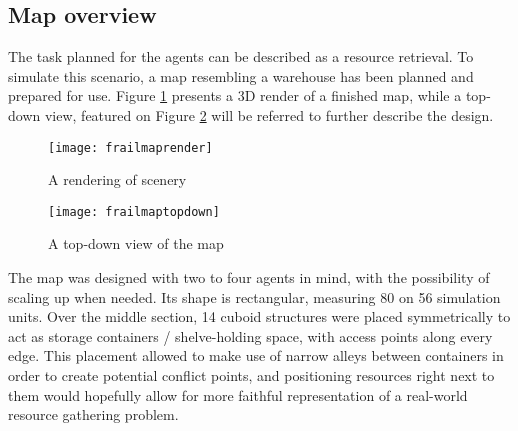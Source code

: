 \subsection{Map overview}
The task planned for the agents can be described as a resource retrieval. To simulate this scenario, a map resembling a warehouse has been planned and prepared for use. Figure \ref{fig:x simmaprender} presents a 3D render of a finished map, while a top-down view, featured on Figure \ref{fig:x simmaptopdown} will be referred to further describe the design.

\begin{figure}[h]
    \centering
    \texttt{[image: frailmaprender]}
    \caption{A rendering of scenery}
    \label{fig:x simmaprender}
\end{figure}

\begin{figure}[h]
    \centering
    \texttt{[image: frailmaptopdown]}
    \caption{A top-down view of the map}
    \label{fig:x simmaptopdown}
\end{figure}

The map was designed with two to four agents in mind, with the possibility of scaling up when needed. Its shape is rectangular, measuring 80 on 56 simulation units. Over the middle section, 14 cuboid structures were placed symmetrically to act as storage containers / shelve-holding space, with access points along every edge. This placement allowed to make use of narrow alleys between containers in order to create potential conflict points, and positioning resources right next to them would hopefully allow for more faithful representation of a real-world resource gathering problem.
